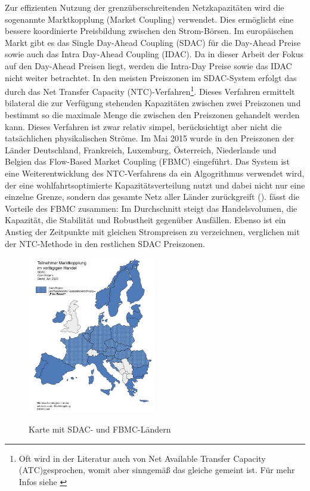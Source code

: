 Zur effizienten Nutzung der grenzüberschreitenden Netzkapazitäten wird die sogenannte Marktkopplung (Market Coupling) verwendet. Dies ermöglicht eine bessere koordinierte Preisbildung zwischen den Strom-Börsen. Im europäischen Markt gibt es das Single Day-Ahead Coupling (SDAC) für die Day-Ahead Preise sowie auch das Intra Day-Ahead Coupling (IDAC). Da in dieser Arbeit der Fokus auf den Day-Ahead Preisen liegt, werden die Intra-Day Preise sowie das IDAC nicht weiter betrachtet. In den meisten Preiszonen im SDAC-System erfolgt das durch das Net Transfer Capacity (NTC)-Verfahren\footnote{Oft wird in der Literatur auch von Net Available Transfer Capacity (ATC)gesprochen, womit aber sinngemäß das gleiche gemeint ist. Für mehr Infos siehe \cite{ENTSOE_ATC_NTC}}. Dieses Verfahren ermittelt bilateral die zur Verfügung stehenden Kapazitäten zwischen zwei Preiszonen und bestimmt so die maximale Menge die zwischen den Preiszonen gehandelt werden kann. Dieses Verfahren ist zwar relativ simpel, berücksichtigt aber nicht die tatsächlichen physikalischen Ströme. Im Mai 2015 wurde in den Preiszonen der Länder Deutschland, Frankreich, Luxemburg, Österreich, Niederlande und Belgien das Flow-Based Market Coupling (FBMC) eingeführt. Das System ist eine Weiterentwicklung des NTC-Verfahrens da ein Algogrithmus verwendet wird, der eine wohlfahrtsoptimierte Kapazitätsverteilung nutzt und dabei nicht nur eine einzelne Grenze, sondern das gesamte Netz aller Länder zurückgreift (\cite{Bundesnetzagentur}). \cite{21} fässt die Vorteile des FBMC zusammen: Im Durchschnitt steigt das Handelsvolumen, die Kapazität,  die Stabilität und Robustheit gegenüber Ausfällen. Ebenso ist ein Anstieg der Zeitpunkte mit gleichen Strompreisen zu verzeichnen, verglichen mit der NTC-Methode in den restlichen SDAC Preiszonen. 

\begin{figure}[htbp]
    \centering  \href{https://www.bundesnetzagentur.de/DE/Fachthemen/ElektrizitaetundGas/HandelundVertrieb/EuropMarktkopplung/artikel.html}{\includegraphics[width=0.5\textwidth]{Graphs/Abbildung1.png}}
    \caption{Karte mit SDAC- und FBMC-Ländern}
    \label{fig:Abbildung1}
\end{figure}

